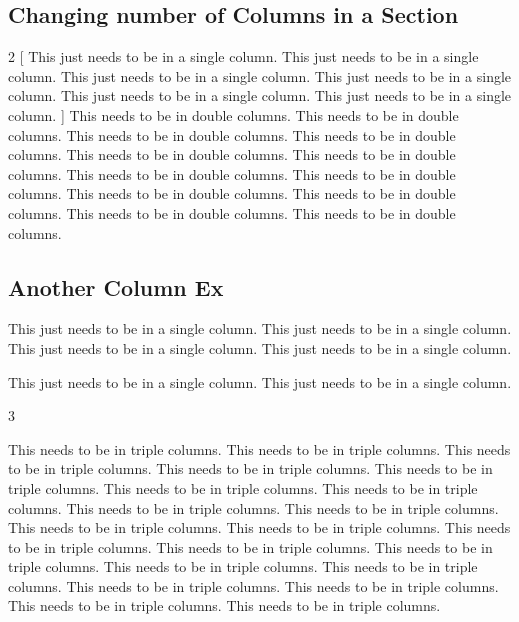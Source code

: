 \documentclass[12pt,twoside,a4paper]{article}
\begin{document}
\subsection*{Changing number of Columns in a Section}
\begin{multicols}{2}
  [
This just needs to be in a single column. This just needs to be in a single column. This just needs to be in a single column. This just needs to be in a single column. This just needs to be in a single column. This just needs to be in a single column.
]
\noindent This needs to be in double columns. This needs to be in double columns.
\newline This needs to be in double columns. This needs to be in double columns.
\newline This needs to be in double columns. This needs to be in double columns.
\newline This needs to be in double columns. This needs to be in double columns.
\newline This needs to be in double columns. This needs to be in double columns.
\newline This needs to be in double columns. This needs to be in double columns.

\end{multicols}

\subsection*{Another Column Ex}
\par This just needs to be in a single column. This just needs to be in a single column. This just needs to be in a single column. This just needs to be in a single column. \par This just needs to be in a single column. This just needs to be in a single column.

\begin{multicols}{3}
  \setlength{\columnsep}{0.5cm}
  \setlength{\columnseprule}{0pt} %

  This needs to be in triple columns. This needs to be in triple columns. This needs to be in triple columns. This needs to be in triple columns. This needs to be in triple columns. This needs to be in triple columns.
  \newline This needs to be in triple columns. This needs to be in triple columns.
  \newline This needs to be in triple columns. This needs to be in triple columns.
  \newline This needs to be in triple columns. This needs to be in triple columns.
  \newline This needs to be in triple columns. This needs to be in triple columns.
  \newline This needs to be in triple columns. This needs to be in triple columns.
  \newline This needs to be in triple columns. This needs to be in triple columns.
  \newline This needs to be in triple columns. This needs to be in triple columns.
\end{multicols}
\end{document}
